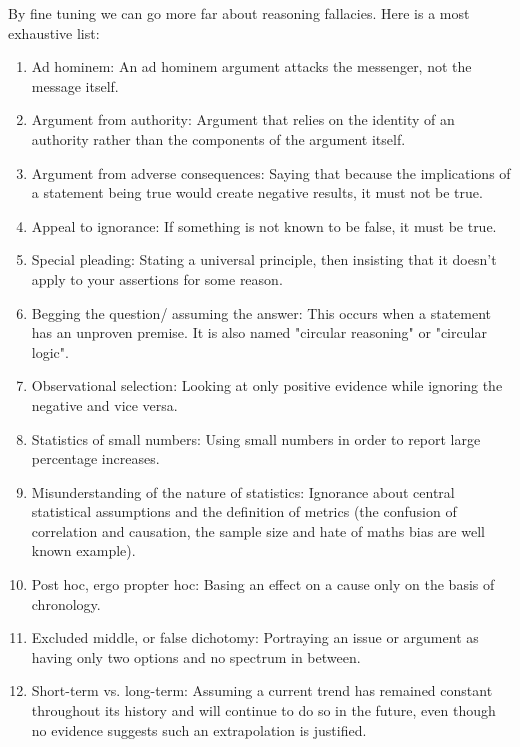 	By fine tuning we can go more far about reasoning fallacies. Here is a most exhaustive list:
	\begin{enumerate}
		\item Ad hominem: An ad hominem argument attacks the messenger, not the message itself.

		\item Argument from authority: Argument that relies on the identity of an authority rather than the components of the argument itself.

		\item Argument from adverse consequences: Saying that because the implications of a statement being true would create negative results, it must not be true.

		\item Appeal to ignorance: If something is not known to be false, it must be true.

		\item Special pleading: Stating a universal principle, then insisting that it doesn't apply to your assertions for some reason.

		\item Begging the question/ assuming the answer: This occurs when a statement has an unproven premise. It is also named "circular reasoning" or "circular logic".

		\item Observational selection: Looking at only positive evidence while ignoring the negative and vice versa.

		\item Statistics of small numbers: Using small numbers in order to report large percentage increases.

		\item Misunderstanding of the nature of statistics: 	
Ignorance about central statistical assumptions and the definition of metrics (the confusion of correlation and causation, the sample size and hate of maths bias are well known example).

		\item Post hoc, ergo propter hoc: Basing an effect on a cause only on the basis of chronology.

		\item Excluded middle, or false dichotomy: Portraying an issue or argument as having only two options and no spectrum in between.

		\item Short-term vs. long-term: Assuming a current trend has remained constant throughout its history and will continue to do so in the future, even though no evidence suggests such an extrapolation is justified.


\end{enumerate}
